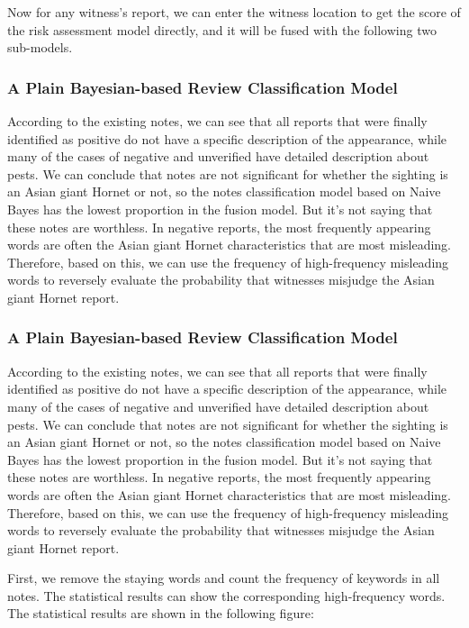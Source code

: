 \documentclass{mcmthesis}
\numberwithin{figure}{section}
\numberwithin{table}{section}
\begin{document}
Now for any witness’s report, we can enter the witness location to get the score of the risk assessment model directly, and it will be fused with the following two sub-models.

\subsubsection{A Plain Bayesian-based Review Classification Model}

According to the existing notes, we can see that all reports that were finally identified as positive do not have a specific description of the appearance, while many of the cases of negative and unverified have detailed description about pests. We can conclude that notes are not significant for whether the sighting is an Asian giant Hornet or not, so the notes classification model based on Naive Bayes has the lowest proportion in the fusion model. But it's not saying that these notes are worthless. In negative reports, the most frequently appearing words are often the Asian giant Hornet characteristics that are most misleading. Therefore, based on this, we can use the frequency of high-frequency misleading words to reversely evaluate the probability that witnesses misjudge the Asian giant Hornet report.

\subsubsection{A Plain Bayesian-based Review Classification Model}
According to the existing notes, we can see that all reports that were finally identified as positive do not have a specific description of the appearance, while many of the cases of negative and unverified have detailed description about pests. We can conclude that notes are not significant for whether the sighting is an Asian giant Hornet or not, so the notes classification model based on Naive Bayes has the lowest proportion in the fusion model. But it's not saying that these notes are worthless. In negative reports, the most frequently appearing words are often the Asian giant Hornet characteristics that are most misleading. Therefore, based on this, we can use the frequency of high-frequency misleading words to reversely evaluate the probability that witnesses misjudge the Asian giant Hornet report.

First, we remove the staying words and count the frequency of keywords in all notes. The statistical results can show the corresponding high-frequency words. The statistical results are shown in the following figure:
\end{document}
